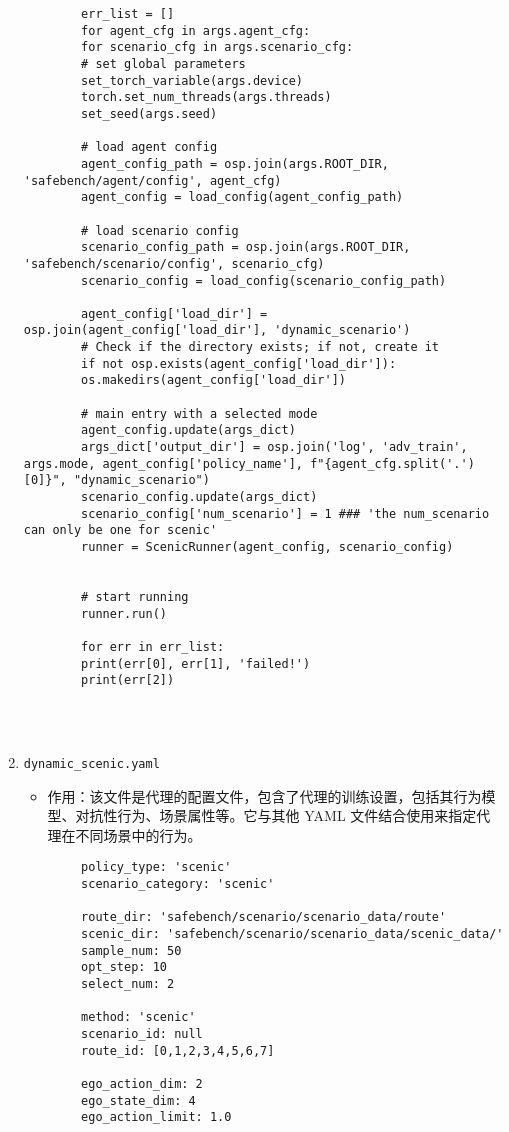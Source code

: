 \begin{enumerate}
\begin{verbatim}
		err_list = []
		for agent_cfg in args.agent_cfg:
		for scenario_cfg in args.scenario_cfg:
		# set global parameters
		set_torch_variable(args.device)
		torch.set_num_threads(args.threads)
		set_seed(args.seed)
		
		# load agent config
		agent_config_path = osp.join(args.ROOT_DIR, 'safebench/agent/config', agent_cfg)
		agent_config = load_config(agent_config_path)
		
		# load scenario config
		scenario_config_path = osp.join(args.ROOT_DIR, 'safebench/scenario/config', scenario_cfg)
		scenario_config = load_config(scenario_config_path)
		
		agent_config['load_dir'] = osp.join(agent_config['load_dir'], 'dynamic_scenario')
		# Check if the directory exists; if not, create it
		if not osp.exists(agent_config['load_dir']):
		os.makedirs(agent_config['load_dir'])        
		
		# main entry with a selected mode
		agent_config.update(args_dict)
		args_dict['output_dir'] = osp.join('log', 'adv_train', args.mode, agent_config['policy_name'], f"{agent_cfg.split('.')[0]}", "dynamic_scenario")
		scenario_config.update(args_dict)
		scenario_config['num_scenario'] = 1 ### 'the num_scenario can only be one for scenic'
		runner = ScenicRunner(agent_config, scenario_config)
		
		
		# start running
		runner.run()
		
		for err in err_list:
		print(err[0], err[1], 'failed!')
		print(err[2])
		
		
		
	\end{verbatim}
	
	\item \texttt{dynamic\_scenic.yaml}
	\begin{itemize}
		\item 作用：该文件是代理的配置文件，包含了代理的训练设置，包括其行为模型、对抗性行为、场景属性等。它与其他 YAML 文件结合使用来指定代理在不同场景中的行为。
	\end{itemize}
	\begin{verbatim}
		policy_type: 'scenic'
		scenario_category: 'scenic'
		
		route_dir: 'safebench/scenario/scenario_data/route'
		scenic_dir: 'safebench/scenario/scenario_data/scenic_data/'
		sample_num: 50
		opt_step: 10
		select_num: 2
		
		method: 'scenic'
		scenario_id: null
		route_id: [0,1,2,3,4,5,6,7]
		
		ego_action_dim: 2
		ego_state_dim: 4
		ego_action_limit: 1.0
		
		
	\end{verbatim}
\end{enumerate}

